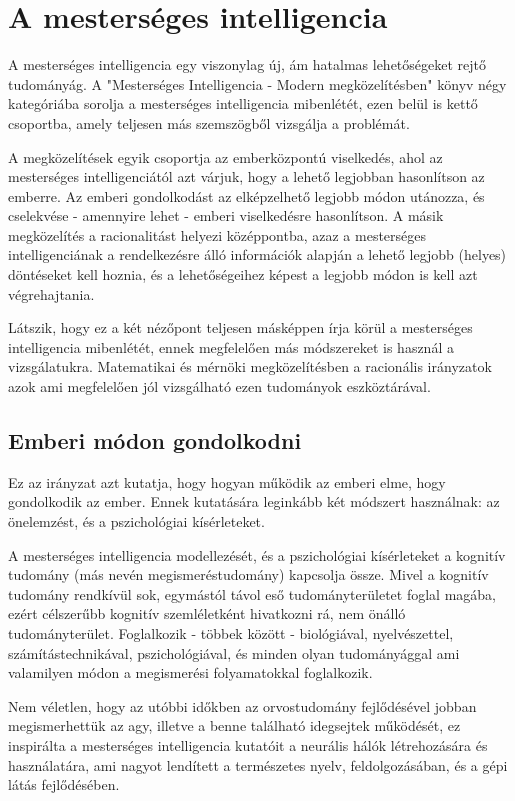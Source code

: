 \label{Chap:tema}

\section {A mesterséges intelligencia}
A mesterséges intelligencia egy viszonylag új, ám hatalmas lehetőségeket rejtő tudományág. A "Mesterséges Intelligencia - Modern megközelítésben" könyv négy kategóriába sorolja a mesterséges intelligencia mibenlétét, ezen belül is kettő csoportba, amely teljesen más szemszögből vizsgálja a problémát.\ujsor

A megközelítések egyik csoportja az emberközpontú viselkedés, ahol az mesterséges intelligenciától azt várjuk, hogy a lehető legjobban hasonlítson az emberre. Az emberi gondolkodást az elképzelhető legjobb módon utánozza, és cselekvése - amennyire lehet - emberi viselkedésre hasonlítson. A másik megközelítés a racionalitást helyezi középpontba, azaz a mesterséges intelligenciának a rendelkezésre álló információk alapján a lehető legjobb (helyes) döntéseket kell hoznia, és a lehetőségeihez képest a legjobb módon is kell azt végrehajtania. \ujsor

Látszik, hogy ez a két nézőpont teljesen másképpen írja körül a mesterséges intelligencia mibenlétét, ennek megfelelően más módszereket is használ a vizsgálatukra. Matematikai és mérnöki megközelítésben a racionális irányzatok azok ami megfelelően jól vizsgálható ezen tudományok eszköztárával.\ujsor

\subsection{Emberi módon gondolkodni}
Ez az irányzat azt kutatja, hogy hogyan működik az emberi elme, hogy gondolkodik az ember. Ennek kutatására leginkább két módszert használnak: az önelemzést, és a pszichológiai kísérleteket.\ujsor

A mesterséges intelligencia modellezését, és a pszichológiai kísérleteket a kognitív tudomány (más nevén megismeréstudomány) kapcsolja össze. Mivel a kognitív tudomány rendkívül sok, egymástól távol eső tudományterületet foglal magába, ezért célszerűbb kognitív szemléletként hivatkozni rá, nem önálló tudományterület. Foglalkozik - többek között - biológiával, nyelvészettel, számítástechnikával, pszichológiával, és minden olyan tudományággal ami valamilyen módon a megismerési folyamatokkal foglalkozik.\ujsor

Nem véletlen, hogy az utóbbi időkben az orvostudomány fejlődésével jobban megismerhettük az agy, illetve a benne található idegsejtek működését, ez inspirálta a mesterséges intelligencia kutatóit a neurális hálók létrehozására és használatára, ami nagyot lendített a természetes nyelv, feldolgozásában, és a gépi látás fejlődésében.


